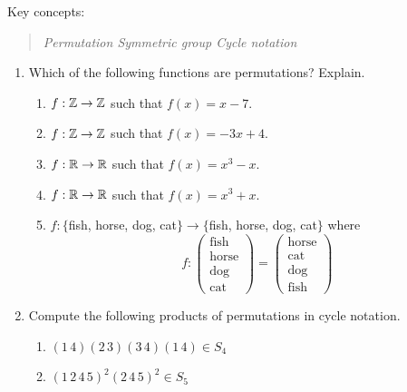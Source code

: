 \begin{exercises}
Key concepts:
\begin{quote}
	\emph{Permutation \qquad Symmetric group \qquad Cycle notation}
\end{quote}

\begin{enumerate}
  \item Which of the following functions are permutations? Explain.
  \begin{enumerate}
      \item $f:\mathbb{Z}\to\mathbb{Z}$ such that $f(x)=x-7$.
      \item $f:\mathbb{Z}\to\mathbb{Z}$ such that $f(x)=-3x+4$.
      \item $f:\mathbb{R}\to\mathbb{R}$ such that $f(x)=x^3-x$.
      \item $f:\mathbb{R}\to\mathbb{R}$ such that $f(x)=x^3+x$.
      \item $f:\{$fish, horse, dog, cat$\}\to\{$fish, horse, dog, cat$\}$ where 
\[f:\begin{pmatrix}
    \text{fish}\\
    \text{horse}\\
    \text{dog}\\
    \text{cat}
    \end{pmatrix}=\begin{pmatrix}
                     \text{horse}\\
                     \text{cat}\\
                     \text{dog}\\
                     \text{fish}
                  \end{pmatrix}\]
  \end{enumerate}
  
  \goodbreak
  
  
  \item Compute the following products of permutations in cycle notation.
  \begin{enumerate}
    \item {}\lstsp $(1\,4)(2\,3)(3\,4)(1\,4)\in S_4$
    \setcounter{enumii}{2}
    \item {}\lstsp $(1\,2\,4\,5)^2(2\,4\,5)^2\in S_5$
  \end{enumerate}
  


\end{enumerate}
\end{exercises}
